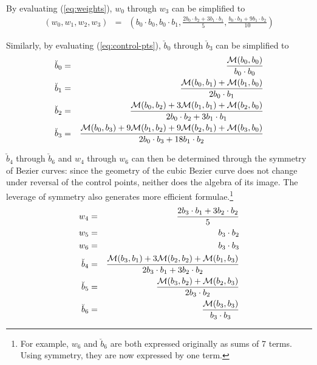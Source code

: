 \documentclass[12pt]{article}
\begin{document}
By evaluating (\ref{eq:weights}), $w_0$ through $w_3$ can be simplified to
\begin{eqnarray}
(w_0,w_1,w_2,w_3) & = & 
(b_0 \cdot b_0, b_0 \cdot b_1, \frac{2b_0 \cdot b_2 + 3b_1 \cdot b_1}{5}, 
\frac{b_0 \cdot b_3 + 9b_1 \cdot b_2}{10}) \nonumber 
\end{eqnarray}

Similarly, by evaluating (\ref{eq:control-pts}), $\breve{b}_0$ through $\breve{b}_3$ 
can be simplified to 
\begin{eqnarray}
\breve{b}_0 & = & %
                    \frac{{\cal M}(b_0,b_0)}{b_0 \cdot b_0} \nonumber \\
\breve{b}_1 & = & %
                    \frac{{\cal M}(b_0,b_1) + {\cal M}(b_1,b_0)}{2b_0\cdot b_1} \nonumber \\
\breve{b}_2 & = & %
                    \frac{{\cal M}(b_0,b_2) + 3{\cal M}(b_1,b_1) + {\cal M}(b_2,b_0)}
	                 {2b_0 \cdot b_2 + 3b_1 \cdot b_1} \nonumber \\
\breve{b}_3 & = & %
                    \frac{{\cal M}(b_0,b_3) + 9{\cal M}(b_1,b_2) + 9{\cal M}(b_2,b_1) + {\cal M}(b_3,b_0)}{2b_0 \cdot b_3 + 18b_1 \cdot b_2} \nonumber
\end{eqnarray}

$\breve{b}_4$ through $\breve{b}_6$ and $w_4$ through $w_6$ can then be determined 
through the symmetry of Bezier curves: 
since the geometry of the cubic Bezier curve does not change 
under reversal of the control points, neither does the algebra of its image.
The leverage of symmetry also generates more efficient formulae.\footnote{For example,
  $w_6$ and $\breve{b}_6$ are both expressed originally as sums of 7 terms.
  Using symmetry, they are now expressed by one term.}
\begin{eqnarray}
w_4 & = & \frac{2b_3 \cdot b_1 + 3b_2 \cdot b_2}{5} \nonumber \\
w_5 & = & b_3 \cdot b_2 \nonumber \\
w_6 & = & b_3 \cdot b_3 \nonumber \\
\breve{b}_4 & = & \frac{{\cal M}(b_3,b_1) + 3{\cal M}(b_2,b_2) + {\cal M}(b_1,b_3)}
	                 {2b_3 \cdot b_1 + 3b_2 \cdot b_2} \nonumber \\
\breve{b}_5 & = & \frac{{\cal M}(b_3,b_2) + {\cal M}(b_2,b_3)}{2b_3\cdot b_2} \nonumber \\
\breve{b}_6 & = & \frac{{\cal M}(b_3,b_3)}{b_3 \cdot b_3} \nonumber
\end{eqnarray}
\QED
\end{document}

